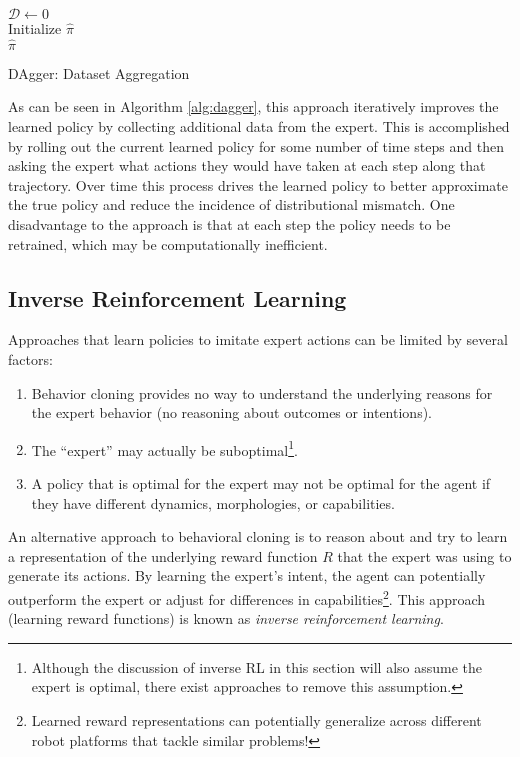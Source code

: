 \begin{algorithm}[ht]
 \KwData{$\pi^*$}
 \KwResult{$\hat{\pi}^*$}
 $\mathcal{D} \xleftarrow{} 0$\\
 Initialize $\hat{\pi}$\\
 \Return $\hat{\pi}$
 \caption{DAgger: Dataset Aggregation}
 \label{alg:dagger}
\end{algorithm}

As can be seen in Algorithm \ref{alg:dagger}, this approach iteratively improves the learned policy by collecting additional data from the expert. This is accomplished by rolling out the current learned policy for some number of time steps and then asking the expert what actions they would have taken at each step along that trajectory. Over time this process drives the learned policy to better approximate the true policy and reduce the incidence of distributional mismatch. One disadvantage to the approach is that at each step the policy needs to be retrained, which may be computationally inefficient.


\subsection{Inverse Reinforcement Learning} \label{subsec:irl}
Approaches that learn policies to imitate expert actions can be limited by several factors:
\begin{enumerate}
    \item Behavior cloning provides no way to understand the underlying reasons for the expert behavior (no reasoning about outcomes or intentions).
    \item The ``expert'' may actually be suboptimal\footnote{Although the discussion of inverse RL in this section will also assume the expert is optimal, there exist approaches to remove this assumption.}.
    \item A policy that is optimal for the expert may not be optimal for the agent if they have different dynamics, morphologies, or capabilities.
\end{enumerate}
An alternative approach to behavioral cloning is to reason about and try to learn a representation of the underlying reward function $R$ that the expert was using to generate its actions. By learning the expert's intent, the agent can potentially outperform the expert or adjust for differences in capabilities\footnote{Learned reward representations can potentially generalize across different robot platforms that tackle similar problems!}. This approach (learning reward functions) is known as \textit{inverse reinforcement learning}.

